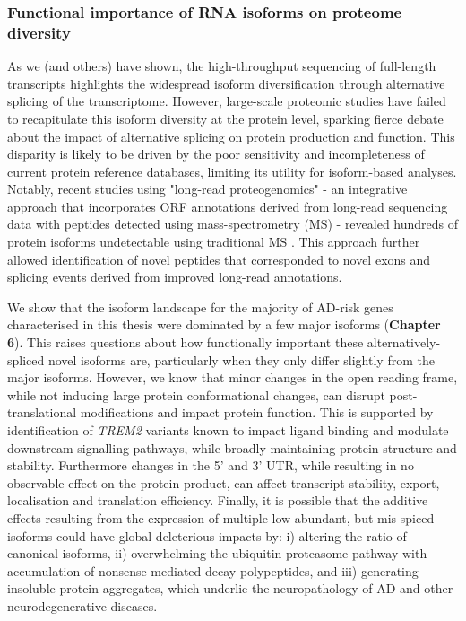 \subsubsection{Functional importance of RNA isoforms on proteome diversity} 
As we (and others) have shown, the high-throughput sequencing of full-length transcripts highlights the widespread isoform diversification through alternative splicing of the transcriptome. However, large-scale proteomic studies have failed to recapitulate this isoform diversity at the protein level, sparking fierce debate about the impact of alternative splicing on protein production and function\cite{Tress2017a,Blencowe2017,Tress2017b}. This disparity is likely to be driven by the poor sensitivity and incompleteness of current protein reference databases, limiting its utility for isoform-based analyses\cite{Reixachs-Sole2022}. Notably, recent studies using "long-read proteogenomics" - an integrative approach that incorporates ORF annotations derived from long-read sequencing data with peptides detected using mass-spectrometry (MS) - revealed hundreds of protein isoforms undetectable using traditional MS \cite{Miller2022,Wang2019a}. This approach further allowed identification of novel peptides that corresponded to novel exons and splicing events derived from improved long-read annotations\cite{Miller2022,KayLeung2021}.  

We show that the isoform landscape for the majority of AD-risk genes characterised in this thesis were dominated by a few major isoforms (\textbf{Chapter 6}). This raises questions about how functionally important these alternatively-spliced novel isoforms are, particularly when they only differ slightly from the major isoforms. However, we know that minor changes in the open reading frame, while not inducing large protein conformational changes, can disrupt post-translational modifications and impact protein function\cite{Reixachs-Sole2022}. This is supported by identification of \textit{TREM2} variants known to impact ligand binding and modulate downstream signalling pathways, while broadly maintaining protein structure and stability\cite{Kober2016}. Furthermore changes in the 5' and 3' UTR, while resulting in no observable effect on the protein product, can affect transcript stability, export, localisation and translation efficiency\cite{Reixachs-Sole2022}. Finally, it is possible that the additive effects resulting from the expression of multiple low-abundant, but mis-spiced isoforms could have global deleterious impacts by: i) altering the ratio of canonical isoforms, ii) overwhelming the ubiquitin-proteasome pathway with accumulation of nonsense-mediated decay polypeptides, and iii) generating insoluble protein aggregates, which underlie the neuropathology of AD and other neurodegenerative diseases\cite{Davis2018}.

